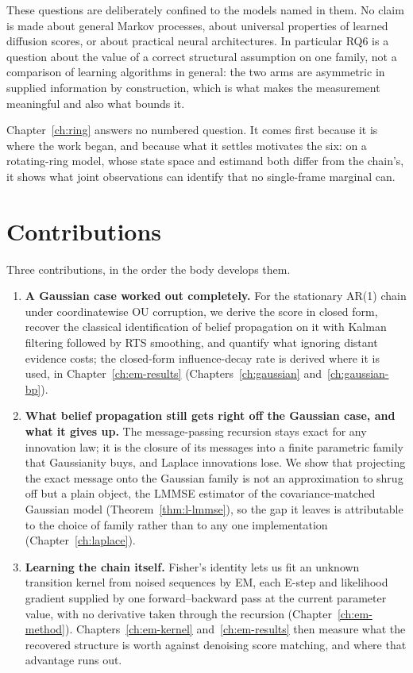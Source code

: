 These questions are deliberately confined to the models named in them.
No claim is made about general Markov processes, about universal
properties of learned diffusion scores, or about practical neural
architectures. In particular RQ6 is a question about the value of a
correct structural assumption on one family, not a comparison of learning
algorithms in general: the two arms are asymmetric in supplied
information by construction, which is what makes the measurement
meaningful and also what bounds it.

Chapter~\ref{ch:ring} answers no numbered question. It comes first because it
is where the work began, and because what it settles motivates the six: on a
rotating-ring model, whose state space and estimand both differ from the
chain's, it shows what joint observations can identify that no single-frame
marginal can.

\section{Contributions}

\noindent Three contributions, in the order the body develops them.

\begin{enumerate}
  \item \textbf{A Gaussian case worked out completely.} For the stationary
  AR(1) chain under coordinatewise OU corruption, we derive the score in
  closed form, recover the classical identification of belief propagation on
  it with Kalman filtering followed by RTS smoothing, and quantify what
  ignoring distant evidence costs; the closed-form influence-decay rate is
  derived where it is used, in
  Chapter~\ref{ch:em-results} (Chapters~\ref{ch:gaussian}
  and~\ref{ch:gaussian-bp}).

  \item \textbf{What belief propagation still gets right off the Gaussian
  case, and what it gives up.} The message-passing recursion stays exact for
  any innovation law; it is the closure of its messages into a finite
  parametric family that Gaussianity buys, and Laplace innovations lose. We
  show that projecting the exact message onto the Gaussian family is not an
  approximation to shrug off but a plain object, the LMMSE estimator of the
  covariance-matched Gaussian model (Theorem~\ref{thm:l-lmmse}), so the gap it
  leaves is attributable to the choice of family rather than to any one
  implementation (Chapter~\ref{ch:laplace}).

  \item \textbf{Learning the chain itself.} Fisher's identity lets us fit an
  unknown transition kernel from noised sequences by EM, each E-step and
  likelihood gradient supplied by one forward--backward pass at the current
  parameter value, with no derivative taken through the recursion
  (Chapter~\ref{ch:em-method}). Chapters~\ref{ch:em-kernel}
  and~\ref{ch:em-results} then measure what the recovered structure is worth
  against denoising score matching, and where that advantage runs out.
\end{enumerate}

